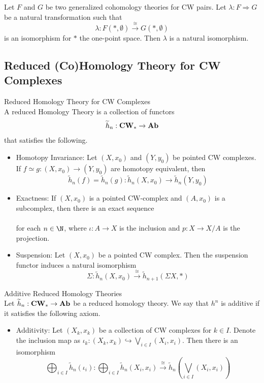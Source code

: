 \documentclass[a4paper]{article}
\begin{document}
\begin{prp}{}{} Let $F$ and $G$ be two generalized cohomology theories for CW pairs. Let $\lambda:F\Rightarrow G$ be a natural transformation such that $$\lambda:F(\ast,\emptyset)\overset{\cong}{\longrightarrow}G(\ast,\emptyset)$$ is an isomorphism for $\ast$ the one-point space. Then $\lambda$ is a natural isomorphism. 
\end{prp}

\subsection{Reduced (Co)Homology Theory for CW Complexes}
\begin{defn}{Reduced Homology Theory for CW Complexes}{}\\
A reduced Homology Theory is a collection of functors $$\widetilde{h}_n:\bold{CW}_\ast\to\bold{Ab}$$ that satisfies the following. 
\begin{itemize}
\item Homotopy Invariance: Let $(X,x_0)$ and $(Y,y_0)$ be pointed CW complexes. If $f\simeq g:(X,x_0)\to(Y,y_0)$ are homotopy equivalent, then $$\widetilde{h}_n(f)=\widetilde{h}_n(g):\widetilde{h}_n(X,x_0)\to\widetilde{h}_n(Y,y_0)$$
\item Exactness: If $(X,x_0)$ is a pointed CW-complex and $(A,x_0)$ is a subcomplex, then there is an exact sequence \\
\\
for each $n\in\N$, where $\iota:A\to X$ is the inclusion and $p:X\to X/A$ is the projection. 
\item Suspension: Let $(X,x_0)$ be a pointed CW complex. Then the suspension functor induces a natural isomorphism $$\Sigma:\widetilde{h}_n(X,x_0)\overset{\cong}{\longrightarrow}\widetilde{h}_{n+1}(\Sigma X,\ast)$$
\end{itemize}
\end{defn}

\begin{defn}{Additive Reduced Homology Theories}{}\\
Let $\widetilde{h}_n:\bold{CW}_\ast\to\bold{Ab}$ be a reduced homology theory. We say that $h^n$ is additive if it satisfies the following axiom. 
\begin{itemize}
\item Additivity: Let $(X_k,x_k)$ be a collection of CW complexes for $k\in I$. Denote the inclusion map as $\iota_k:(X_k,x_k)\hookrightarrow\bigvee_{i\in I}(X_i,x_i)$. Then there is an isomorphism $$\bigoplus_{i\in I}\widetilde{h}_n(\iota_i):\bigoplus_{i\in I}\widetilde{h}_n(X_i,x_i)\overset{\cong}{\longrightarrow}\widetilde{h}_n\left(\bigvee_{i\in I}(X_i,x_i)\right)$$
\end{itemize}
\end{defn}
\end{document}
